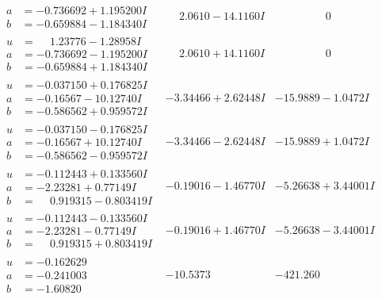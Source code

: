 \documentclass[1p]{elsarticle_modified}
\theoremstyle{definition}
\begin{document}
$$\begin{array}{c|c|c}
\begin{aligned}
a &= -0.736692 + 1.195200 I \\
b &= -0.659884 - 1.184340 I\end{aligned}
 & \phantom{-}2.0610 - 14.1160 I & \phantom{-0.000000 } 0 \\ \hline\begin{aligned}
u &= \phantom{-}1.23776 - 1.28958 I \\
a &= -0.736692 - 1.195200 I \\
b &= -0.659884 + 1.184340 I\end{aligned}
 & \phantom{-}2.0610 + 14.1160 I & \phantom{-0.000000 } 0 \\ \hline\begin{aligned}
u &= -0.037150 + 0.176825 I \\
a &= -0.16567 - 10.12740 I \\
b &= -0.586562 + 0.959572 I\end{aligned}
 & -3.34466 + 2.62448 I & -15.9889 - 1.0472 I \\ \hline\begin{aligned}
u &= -0.037150 - 0.176825 I \\
a &= -0.16567 + 10.12740 I \\
b &= -0.586562 - 0.959572 I\end{aligned}
 & -3.34466 - 2.62448 I & -15.9889 + 1.0472 I \\ \hline\begin{aligned}
u &= -0.112443 + 0.133560 I \\
a &= -2.23281 + 0.77149 I \\
b &= \phantom{-}0.919315 - 0.803419 I\end{aligned}
 & -0.19016 - 1.46770 I & -5.26638 + 3.44001 I \\ \hline\begin{aligned}
u &= -0.112443 - 0.133560 I \\
a &= -2.23281 - 0.77149 I \\
b &= \phantom{-}0.919315 + 0.803419 I\end{aligned}
 & -0.19016 + 1.46770 I & -5.26638 - 3.44001 I \\ \hline\begin{aligned}
u &= -0.162629\phantom{ +0.000000I} \\
a &= -0.241003\phantom{ +0.000000I} \\
b &= -1.60820\phantom{ +0.000000I}\end{aligned}
 & -10.5373\phantom{ +0.000000I} & -421.260\phantom{ +0.000000I} \\ \hline\begin{aligned}

\end{aligned}
\end{array}$$
\end{document}
